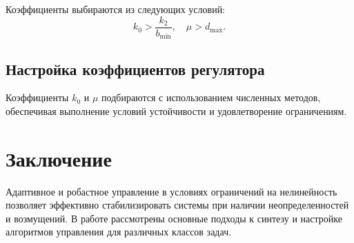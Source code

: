 \documentclass[a4paper,14pt]{extarticle} %
\begin{document}
Коэффициенты выбираются из следующих условий:
\begin{equation}
k_0 > \frac{k_2}{b_{\text{min}}}, \quad \mu > d_{\text{max}}.
\end{equation}

\subsection*{Настройка коэффициентов регулятора}
Коэффициенты $k_0$ и $\mu$ подбираются с использованием численных методов, обеспечивая выполнение условий устойчивости и удовлетворение ограничениям.

\section*{Заключение}
Адаптивное и робастное управление в условиях ограничений на нелинейность позволяет эффективно стабилизировать системы при наличии неопределенностей и возмущений. В работе рассмотрены основные подходы к синтезу и настройке алгоритмов управления для различных классов задач.
\end{document}

